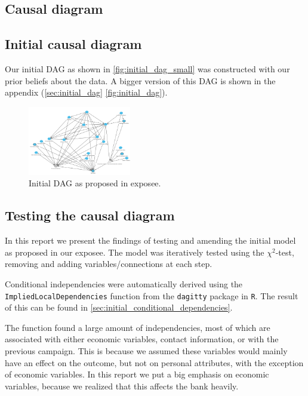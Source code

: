 \documentclass[11pt,]{article}
\begin{document}
\begin{multicols}{2}
\hypertarget{causal-diagram}{%
\section{Causal diagram}\label{causal-diagram}}

\hypertarget{initial-causal-diagram}{%
\subsection{Initial causal diagram}\label{initial-causal-diagram}}

Our initial DAG as shown in \autoref{fig:initial_dag_small} was
constructed with our prior beliefs about the data. A bigger version of
this DAG is shown in the appendix (\autoref{sec:initial_dag}
\autoref{fig:initial_dag}).

\begin{figure}[H]
    \centering
    \includegraphics[width=0.4\textwidth]{images/initial_dag}
    \caption{Initial DAG as proposed in exposee.}
    \label{fig:initial_dag_small}
\end{figure}

\hypertarget{testing-the-causal-diagram}{%
\subsection{Testing the causal
diagram}\label{testing-the-causal-diagram}}

In this report we present the findings of testing and amending the
initial model as proposed in our exposee. The model was iteratively
tested using the \(\chi^2\)-test, removing and adding
variables/connections at each step.

Conditional independencies were automatically derived using the
\texttt{ImpliedLocalDependencies} function from the \texttt{dagitty}
package in \texttt{R}. The result of this can be found in
\autoref{sec:initial_conditional_dependencies}.

The function found a large amount of independencies, most of which are
associated with either economic variables, contact information, or with
the previous campaign. This is because we assumed these variables would
mainly have an effect on the outcome, but not on personal attributes,
with the exception of economic variables. In this report we put a big
emphasis on economic variables, because we realized that this affects
the bank heavily.


\end{multicols}
\end{document}
